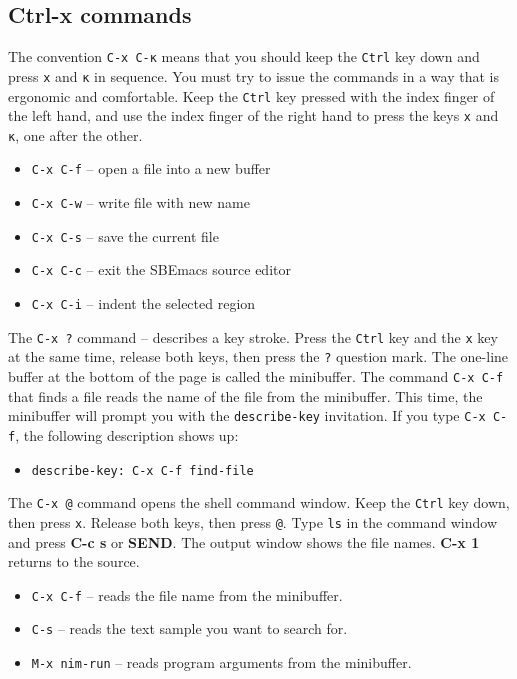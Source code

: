 \documentclass[
  12pt,
]{book}
\providecommand{\tightlist}{%
  \setlength{\itemsep}{0pt}\setlength{\parskip}{0pt}}
\begin{document}
\subsection*{Ctrl-x commands}\label{Ctrl-x}

The convention \texttt{C-x\ C-κ} means that you should keep the
\texttt{Ctrl} key down and press \texttt{x} and \texttt{κ} in sequence.
You must try to issue the commands in a way that is ergonomic and
comfortable. Keep the \texttt{Ctrl} key pressed with the index finger of
the left hand, and use the index finger of the right hand to press the
keys \texttt{x} and \texttt{κ}, one after the other.

\begin{itemize}
\tightlist
\item
  \texttt{C-x\ C-f} -- open a file into a new buffer
\item
  \texttt{C-x\ C-w} -- write file with new name
\item
  \texttt{C-x\ C-s} -- save the current file
\item
  \texttt{C-x\ C-c} -- exit the SBEmacs source editor
\item
  \texttt{C-x\ C-i} -- indent the selected region
\end{itemize}

The \texttt{C-x\ ?} command -- describes a key stroke. Press the
\texttt{Ctrl} key and the \texttt{x} key at the same time, release both
keys, then press the \texttt{?} question mark. The one-line buffer at
the bottom of the page is called the minibuffer. The command
\texttt{C-x\ C-f} that finds a file reads the name of the file from the
minibuffer. This time, the minibuffer will prompt you with the
\texttt{describe-key} invitation. If you type \texttt{C-x\ C-f}, the
following description shows up:

\begin{itemize}
\tightlist
\item
  \texttt{describe-key:\ C-x\ C-f\ find-file}
\end{itemize}

The \texttt{C-x\ @} command opens the shell command window. Keep the
\texttt{Ctrl} key down, then press \texttt{x}. Release both keys, then
press \texttt{@}. Type \texttt{ls} in the command window and press
\textbf{C-c s} or \textbf{SEND}. The output window shows the file names.
\textbf{C-x 1} returns to the source.

\begin{itemize}
\tightlist
\item
  \texttt{C-x\ C-f} -- reads the file name from the minibuffer.
\item
  \texttt{C-s} -- reads the text sample you want to search for.
\item
  \texttt{M-x\ nim-run} -- reads program arguments from the minibuffer.
\end{itemize}
\end{document}
